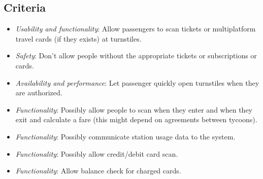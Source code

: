 \subsection*{Criteria}
\begin{itemize}
    \item \textit{Usability and functionality}: Allow passengers to scan tickets or multiplatform travel cards (if they exists) at turnstiles.
    \item \textit{Safety}: Don't allow people without the appropriate tickets or subscriptions or cards.
    \item \textit{Availability and performance}: Let passenger quickly open turnstiles when they are authorized.
    \item \textit{Functionality}: Possibly allow people to scan when they enter and when they exit and calculate a fare (this might depend on agreements between tycoons). 
    \item \textit{Functionality}: Possibly communicate station usage data to the system.
    \item \textit{Functionality}: Possibly allow credit/debit card scan.
    \item \textit{Functionality}: Allow balance check for charged cards.
\end{itemize}
    

